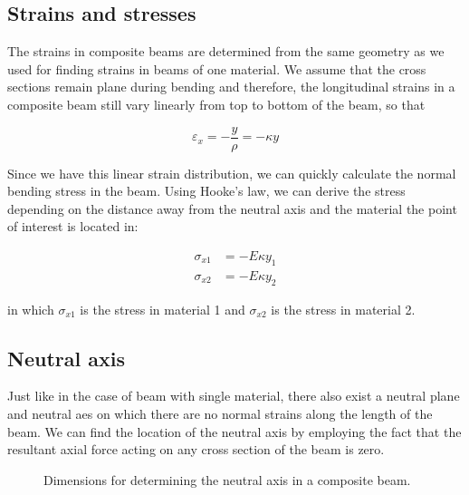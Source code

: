 \documentclass[
10pt,
a4paper,
openany,
svgnames,
]{kaobook} %
\begin{document}
\subsection{Strains and stresses}

The strains in composite beams are determined from the same geometry as we used for finding strains in beams of one material. We assume that the cross sections remain plane during bending and therefore, the longitudinal strains in a composite beam still vary linearly from top to bottom of the beam, so that

\begin{equation}
  {\varepsilon _x} =  - \frac{y}{\rho } =  - \kappa y
\end{equation}

Since we have this linear strain distribution, we can quickly calculate the normal bending stress in the beam. Using Hooke’s law, we can derive the stress depending on the distance away from the neutral axis and the material the point of interest is located in:

\begin{align}
  {\sigma _{x1}} &=  - E\kappa {y_1}  \nonumber \\
  {\sigma _{x2}} &=  - E\kappa {y_2} 
\end{align}

in which $\sigma_{x1}$ is the stress in material 1 and $\sigma_{x2}$ is the stress in material 2.

\subsection{Neutral axis}

Just like in the case of beam with single material, there also exist a neutral plane and neutral aes on which there are no normal strains along the length of the beam. We can find the location of the neutral axis by employing the fact that the resultant axial force acting on any cross section of the beam is zero.

\begin{figure}[h]
  \centering
  \caption{Dimensions for determining the neutral axis in a composite beam.}
\end{figure}
\end{document}
